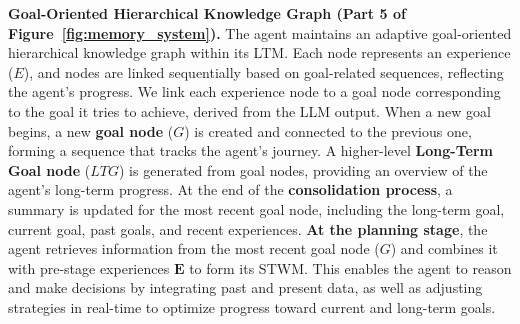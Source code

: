 
\textbf{Goal-Oriented Hierarchical Knowledge Graph (Part 5 of Figure~\ref{fig:memory_system}).} %
The agent maintains an adaptive goal-oriented hierarchical knowledge graph within its LTM. Each node represents an experience ($E$), and nodes are linked sequentially based on goal-related sequences, reflecting the agent's progress. We link each experience node to a goal node corresponding to the goal it tries to achieve, derived from the LLM output.
When a new goal begins, a new \textbf{goal node} ($G$) is created and connected to the previous one, forming a sequence that tracks the agent's journey. A higher-level \textbf{Long-Term Goal node} ($LTG$) is generated from goal nodes, providing an overview of the agent’s long-term progress. At the end of the \textbf{consolidation process}, a summary is updated for the most recent goal node, including the long-term goal, current goal, past goals, and recent experiences. \textbf{At the planning stage}, the agent retrieves information from the most recent goal node ($G$) and combines it with pre-stage experiences $\boldsymbol{E}$ to form its STWM. This enables the agent to reason and make decisions by integrating past and present data, as well as adjusting strategies in real-time to optimize progress toward current and long-term goals.

